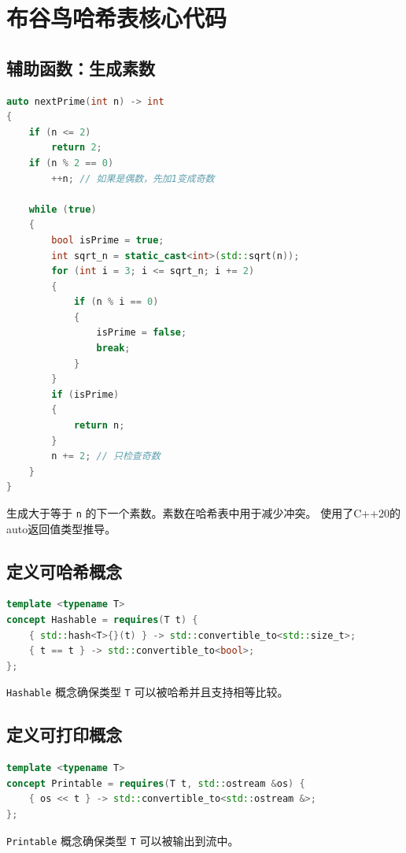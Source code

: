 \documentclass[UTF8]{ctexart}
\begin{document}
\pagestyle{fancy}
\fancyhead{}

\section{布谷鸟哈希表核心代码}

\subsection{辅助函数：生成素数}
\begin{lstlisting}[language=C++]
auto nextPrime(int n) -> int
{
    if (n <= 2)
        return 2;
    if (n % 2 == 0)
        ++n; // 如果是偶数，先加1变成奇数

    while (true)
    {
        bool isPrime = true;
        int sqrt_n = static_cast<int>(std::sqrt(n));
        for (int i = 3; i <= sqrt_n; i += 2)
        {
            if (n % i == 0)
            {
                isPrime = false;
                break;
            }
        }
        if (isPrime)
        {
            return n;
        }
        n += 2; // 只检查奇数
    }
}
\end{lstlisting}
生成大于等于 \texttt{n} 的下一个素数。素数在哈希表中用于减少冲突。
使用了C++20的auto返回值类型推导。

\subsection{定义可哈希概念}
\begin{lstlisting}[language=C++]
template <typename T>
concept Hashable = requires(T t) {
    { std::hash<T>{}(t) } -> std::convertible_to<std::size_t>;
    { t == t } -> std::convertible_to<bool>;
};
\end{lstlisting}
\texttt{Hashable} 概念确保类型 \texttt{T} 可以被哈希并且支持相等比较。

\subsection{定义可打印概念}
\begin{lstlisting}[language=C++]
template <typename T>
concept Printable = requires(T t, std::ostream &os) {
    { os << t } -> std::convertible_to<std::ostream &>;
};
\end{lstlisting}
\texttt{Printable} 概念确保类型 \texttt{T} 可以被输出到流中。
\end{document}
